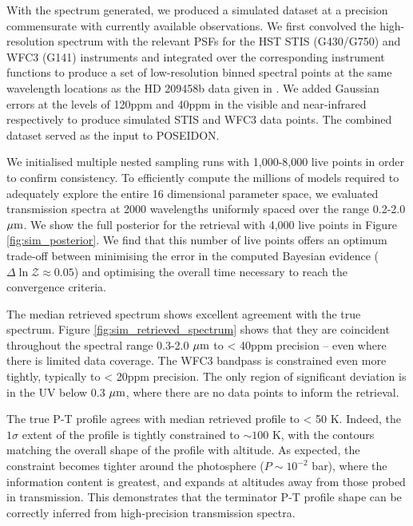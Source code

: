 \documentclass[fleqn,usenatbib]{mnras}
\begin{document}
With the spectrum generated, we produced a simulated dataset at a precision commensurate with currently available observations. We first convolved the high-resolution spectrum with the relevant PSFs for the HST STIS (G430/G750) and WFC3 (G141) instruments and integrated over the corresponding instrument functions to produce a set of low-resolution binned spectral points at the same wavelength locations as the HD 209458b data given in \citet{Sing2016}. We added Gaussian errors at the levels of 120ppm and 40ppm in the visible and near-infrared respectively to produce simulated STIS and WFC3 data points. The combined dataset served as the input to POSEIDON.

We initialised multiple nested sampling runs with 1,000-8,000 live points in order to confirm consistency. To efficiently compute the millions of models required to adequately explore the entire 16 dimensional parameter space, we evaluated transmission spectra at 2000 wavelengths uniformly spaced over the range 0.2-2.0 $\hbox{$\mu$m}$. We show the full posterior for the retrieval with 4,000 live points in Figure \ref{fig:sim_posterior}. We find that this number of live points offers an optimum trade-off between minimising the error in the computed Bayesian evidence ($\Delta \ln \mathcal{Z} \approx 0.05$) and optimising the overall time necessary to reach the convergence criteria.

The median retrieved spectrum shows excellent agreement with the true spectrum. Figure \ref{fig:sim_retrieved_spectrum} shows that they are coincident throughout the spectral range 0.3-2.0 $\hbox{$\mu$m}$ to < 40ppm precision -- even where there is limited data coverage. The WFC3 bandpass is constrained even more tightly, typically to < 20ppm precision. The only region of significant deviation is in the UV below 0.3 $\hbox{$\mu$m}$, where there are no data points to inform the retrieval.

The true P-T profile agrees with median retrieved profile to < 50 K. Indeed, the $1\sigma$ extent of the profile is tightly constrained to $\sim 100$ K, with the contours matching the overall shape of the profile with altitude. As expected, the constraint becomes tighter around the photosphere ($P \sim 10^{-2}$ bar), where the information content is greatest, and expands at altitudes away from those probed in transmission. This demonstrates that the terminator P-T profile shape can be correctly inferred from high-precision transmission spectra.
\end{document}
